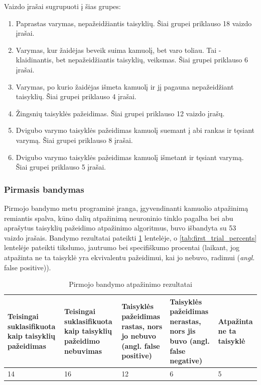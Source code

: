 \documentclass{VUMIFPSbakalaurinis}
\begin{document}
Vaizdo įrašai sugrupuoti į šias grupes: 

\begin{enumerate}
	\item Paprastas varymas, nepažeidžiantis taisyklių. Šiai grupei priklauso 18 vaizdo įrašai.
	\item Varymas, kur žaidėjas beveik suima kamuolį, bet varo toliau. Tai - klaidinantis, bet nepažeidžiantis taisyklių, veiksmas. Šiai grupei priklauso 6 įrašai. 
	\item Varymas, po kurio žaidėjas išmeta kamuolį ir jį pagauna nepažeidžiant taisyklių. Šiai grupei priklauso 4 įrašai. 
	\item Žingsnių taisyklės pažeidimas. Šiai grupei priklauso 12 vaizdo įrašų.
	\item Dvigubo varymo taisyklės pažeidimas kamuolį suemant į abi rankas ir tęsiant varymą. Šiai grupei priklauso 8 įrašai.
	\item Dvigubo varymo taisyklės pažeidimas kamuolį išmetant ir tęsiant varymą. Šiai grupei priklauso 5 įrašai. 
\end{enumerate}

\subsubsection{Pirmasis bandymas}

Pirmojo bandymo metu programinė įranga, įgyvendinanti kamuolio atpažinimą remiantis spalva, kūno dalių atpažinimą neuroninio tinklo pagalba bei abu aprašytus taisyklių pažeidimo atpažinimo algoritmus, buvo išbandyta su 53 vaizdo įrašais. Bandymo rezultatai pateikti \ref{tab:first_trial} lentelėje, o \ref{tab:first_trial_percents} lentelėje pateikti tikslumo, jautrumo bei specifiškumo procentai (laikant, jog atpažinta ne ta taisyklė yra ekvivalentu pažeidimui, kai jo nebuvo, radimui (\textit{angl.} false positive)). 

 \begin{table}[H]\footnotesize
 	\centering
 	\caption{Pirmojo bandymo atpažinimo rezultatai}
 	{\begin{tabular}{|p{3cm}|p{3cm}|p{3cm}|p{3cm}|p{2cm}|} \hline
 			\textbf{Teisingai suklasifikuota kaip taisyklių pažeidimas} & \textbf{Teisingai suklasifikuota kaip taisyklių pažeidimo nebuvimas} & \textbf{Taisyklės pažeidimas rastas, nors jo nebuvo (angl. false positive)} & \textbf{Taisyklės pažeidimas nerastas, nors jis buvo (angl. false negative)} & \textbf{Atpažinta ne ta taisyklė} \\
 			\hline
 			14  & 16    & 12    & 6    & 5   \\

 			\hline
 	\end{tabular}}
 	\label{tab:first_trial}
 \end{table}
\end{document}
